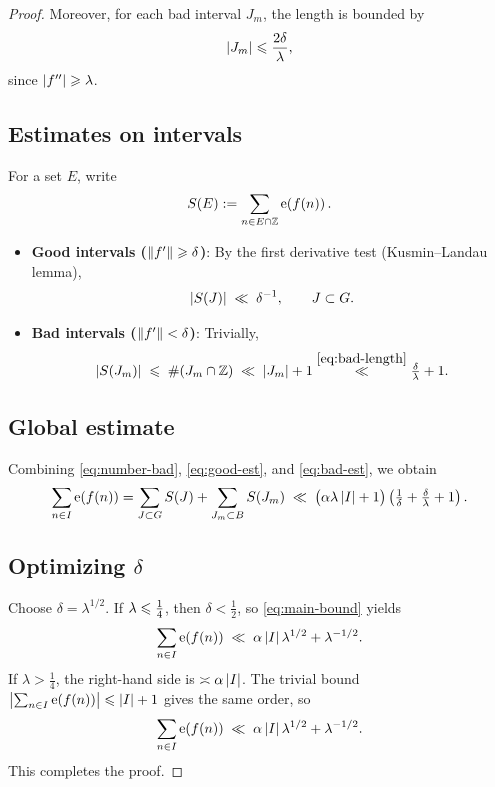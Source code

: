 \begin{proof}
Moreover, for each bad interval \(J_m\), the length is bounded by
\begin{equation}\label{eq:bad-length}
   \left\lvert J_m \right\rvert \leqslant \frac{2\delta}{\lambda},
\end{equation}
since \(\left\lvert f'' \right\rvert\geqslant \lambda\).

\subsection*{Estimates on intervals}
For a set \(E\), write
\[
   S(E) := \sum_{n \in E \cap \mathbb{Z}} \operatorname{e} \! \left( f(n) \right).
\]

\begin{itemize}[leftmargin=2em]
   \item \textbf{Good intervals (\(\left\lVert f' \right\rVert \geqslant \delta\))}:  
   By the first derivative test (Kusmin--Landau lemma),
   \begin{equation}\label{eq:good-est}
      \left\lvert S(J) \right\rvert \;\ll\; \delta^{-1}, 
      \qquad J \subset G.
   \end{equation}

   \item \textbf{Bad intervals (\(\left\lVert f' \right\rVert < \delta\))}:  
   Trivially,
   \begin{equation}\label{eq:bad-est}
      \left\lvert S(J_m) \right\rvert \;\leqslant\; \#(J_m \cap \mathbb{Z}) 
      \;\ll\; \left\lvert J_m \right\rvert + 1 
      \stackrel{\eqref{eq:bad-length}}{\ll} \tfrac{\delta}{\lambda} + 1.
   \end{equation}
\end{itemize}

\subsection*{Global estimate}
Combining \eqref{eq:number-bad}, \eqref{eq:good-est}, and \eqref{eq:bad-est}, we obtain
\begin{equation}\label{eq:main-bound}
   \sum_{n \in I} \operatorname{e} \! \left( f(n) \right)
   = \sum_{J \subset G} S(J) + \sum_{J_m \subset B} S(J_m)
   \;\ll\; \big(\alpha \lambda \left\lvert I \right\rvert + 1\big)
          \left( \tfrac{1}{\delta} + \tfrac{\delta}{\lambda} + 1 \right).
\end{equation}

\subsection*{Optimizing \(\delta\)}
Choose \(\delta = \lambda^{1/2}\). If \(\lambda \leqslant \tfrac14\), then \(\delta < \tfrac12\), so \eqref{eq:main-bound} yields
\[
    \sum_{n \in I} \operatorname{e} \! \left( f(n) \right)
    \;\ll\; \alpha \left\lvert I \right\rvert \lambda^{1/2} + \lambda^{-1/2}.
\]
If \(\lambda > \tfrac14\), the right-hand side is \(\asymp \alpha \left\lvert I \right\rvert\).  
The trivial bound \(\left\lvert \sum_{n \in I} \operatorname{e} \! \left( f(n) \right) \right\rvert \leqslant \left\lvert I \right\rvert+1\) gives the same order, so
\[
    \sum_{n \in I} \operatorname{e} \! \left( f(n) \right)
    \;\ll\; \alpha \left\lvert I \right\rvert \lambda^{1/2} + \lambda^{-1/2}.
\]
This completes the proof.
\end{proof}

